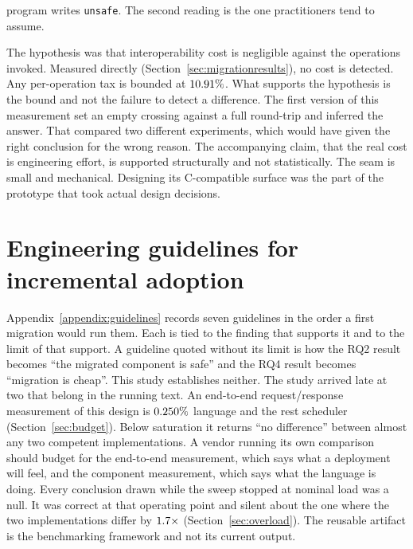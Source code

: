 \documentclass[english,oneside,a4paper,censored,csm,software-track-2020]{HYthesisML}
\begin{document}
\begin{description}
        program writes \texttt{unsafe}. The second reading is the one practitioners tend to
        assume.
  \item[H3: supported, and tested the right way on the second attempt.] The hypothesis was
        that interoperability cost is negligible against the operations invoked. Measured
        directly (Section~\ref{sec:migrationresults}), no cost is detected. Any per-operation tax
        is bounded at $10.91\%$. What supports the hypothesis is the bound and not the
        failure to detect a difference. The first version of this measurement set an empty crossing
        against a full round-trip and inferred the answer. That compared two different experiments, which would have given the right conclusion for the
        wrong reason. The
        accompanying claim, that the real cost is engineering effort, is supported structurally
        and not statistically. The seam is small and mechanical. Designing its C-compatible
        surface was the part of the prototype that took actual design decisions.
\end{description}

\section{Engineering guidelines for incremental adoption}
\label{sec:guidelines}
Appendix~\ref{appendix:guidelines} records seven guidelines in the order a first migration would
run them. Each is tied to the finding that supports it and to the limit of that support. A
guideline quoted without its limit is how the RQ2 result becomes ``the migrated component is
safe'' and the RQ4 result becomes ``migration is cheap''. This study establishes neither. The study arrived late at two that belong in the running
text. An end-to-end
request/response measurement of this design is $0.250\%$ language and the rest
scheduler (Section~\ref{sec:budget}). Below saturation it returns ``no difference'' between
almost any two competent implementations. A vendor running its own comparison should budget for
the end-to-end measurement, which says what a deployment will feel, and the component
measurement, which says what the language is doing. Every conclusion drawn while the sweep stopped at nominal load was a null. It was correct at
that operating point and silent about the one where the two implementations differ by
$1.7\times$ (Section~\ref{sec:overload}). The reusable artifact is the benchmarking framework and not its
current output.
\end{document}

